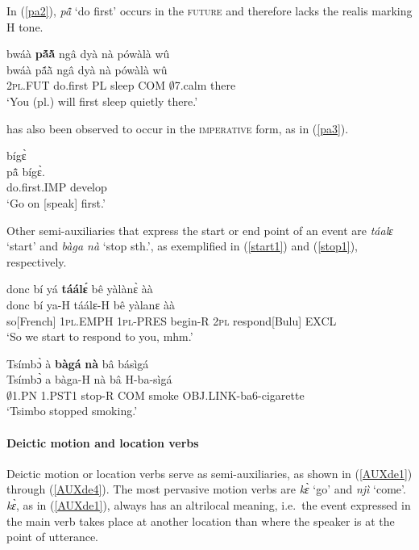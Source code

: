 \noindent In (\ref{pa2}), {\itshape pã̂} `do first' occurs in the \textsc{future} and therefore lacks the realis marking H tone.

\begin{exe} 
\ex\label{pa2}
  \glll bwáà {\bfseries pã́ã̀} ngâ dyà nà pówàlà wû\\
        bwáà pã́ã̀ ngâ dyà nà pówàlà wû \\
        2\textsc{pl}.FUT do.first PL sleep COM $\emptyset$7.calm there \\
    \trans `You (pl.) will first sleep quietly there.'
\end{exe}

 has also been observed to occur in the \textsc{imperative} form, as in (\ref{pa3}).

\begin{exe} 
\ex\label{pa3}
   bígɛ̀  \\
        pã̂ bígɛ̀.  \\
         do.first.IMP  develop \\
    \trans `Go on [speak] first.'
\end{exe}




Other semi-auxiliaries that express the start or end point of an event are {\itshape táalɛ} `start' and {\itshape bàga nà} `stop sth.', as exemplified in (\ref{start1}) and (\ref{stop1}), respectively.

\begin{exe} 
\ex\label{start1} 
  \glll  donc bí yá {\bfseries táálɛ́} bê yàlànɛ̀ àà \\
        donc bí ya-H táálɛ-H bê yàlanɛ àà \\
       so[French] 1\textsc{pl}.EMPH  1\textsc{pl}-PRES begin-R 2\textsc{pl} respond[Bulu] EXCL   \\
    \trans `So we start to respond to you, mhm.'
\end{exe}


\begin{exe} 
\ex\label{stop1} 
  \glll  Tsímbɔ̀ à {\bfseries bàgá} {\bfseries nà} bâ básìgá \\
        Tsímbɔ̀ a bàga-H nà bâ H-ba-sìgá  \\
       $\emptyset$1.PN 1.PST1 stop-R COM smoke OBJ.LINK-ba6-cigarette  \\
    \trans `Tsimbo stopped smoking.'
\end{exe}



\paragraph{Deictic motion and location verbs}
Deictic motion or location verbs serve as semi-auxiliaries, as shown in (\ref{AUXde1}) through (\ref{AUXde4}). The most pervasive motion verbs are {\itshape kɛ̀} `go' and {\itshape njì} `come'. {\itshape kɛ̀}, as in (\ref{AUXde1}), always has an altrilocal meaning, i.e.\ the event expressed in the main verb takes place at another location than where the speaker is at the point of utterance.


